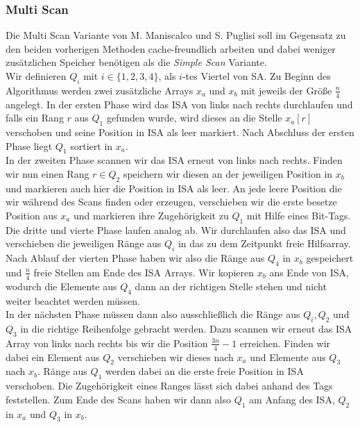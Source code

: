 \subsubsection{Multi Scan}
Die Multi Scan Variante von M. Maniscalco und S. Puglisi \cite{Maniscalco} soll im Gegensatz zu den beiden vorherigen Methoden cache-freundlich arbeiten und dabei weniger zusätzlichen Speicher benötigen als die \textit{Simple Scan} Variante.\\
Wir definieren $Q_i$ mit $i \in \{1,2,3,4\}$, als $i$-tes Viertel von SA. Zu Beginn des Algorithmus werden zwei zusätzliche Arrays $x_a$ und $x_b$ mit jeweils der Größe $\frac{n}{4}$ angelegt. In der ersten Phase wird das ISA von links nach rechts durchlaufen und falls ein Rang $r$ aus $Q_1$ gefunden wurde, wird dieses an die Stelle $x_a[r]$ verschoben und seine Position in ISA als leer markiert. Nach Abschluss der ersten Phase liegt $Q_1$ sortiert in $x_a$.\\
In der zweiten Phase scannen wir das ISA erneut von links nach rechts. Finden wir nun einen Rang $r \in Q_2$ speichern wir diesen an der jeweiligen Position in $x_b$ und markieren auch hier die Position in ISA als leer. An jede leere Position die wir während des Scans finden oder erzeugen, verschieben wir die erste besetze Position aus $x_a$ und markieren ihre Zugehörigkeit zu $Q_1$ mit Hilfe eines Bit-Tags. \\
Die dritte und vierte Phase laufen analog ab. Wir durchlaufen also das ISA und verschieben die jeweiligen Ränge aus $Q_i$ in das zu dem Zeitpunkt freie Hilfsarray. \\
Nach Ablauf der vierten Phase haben wir also die Ränge aus $Q_4$ in $x_b$ gespeichert und $\frac{n}{4}$ freie Stellen am Ende des ISA Arrays. Wir kopieren $x_b$ ans Ende von ISA, wodurch die Elemente aus $Q_4$ dann an der richtigen Stelle stehen und nicht weiter beachtet werden müssen.\\
In der nächsten Phase müssen dann also ausschließlich die Ränge aus $Q_i,Q_2$ und $Q_3$ in die richtige Reihenfolge gebracht werden. Dazu scannen wir erneut das ISA Array von links nach rechts bis wir die Position $\frac{3n}{4}-1$ erreichen. Finden wir dabei ein Element aus $Q_2$ verschieben wir dieses nach $x_a$ und Elemente aus $Q_3$ nach $x_b$. Ränge aus $Q_1$ werden dabei an die erste freie Position in ISA verschoben. Die Zugehörigkeit eines Ranges lässt sich dabei anhand des Tags feststellen. Zum Ende des Scans haben wir dann also $Q_1$ am Anfang des ISA, $Q_2$ in $x_a$ und $Q_3$ in $x_b$. \\

